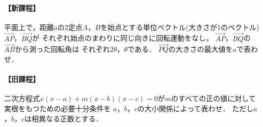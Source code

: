 \documentclass[../../main.tex]{subfiles}
\begin{document}
\paragraph{【新課程】}
平面上で，距離$a$の2定点$A$，$B$を始点とする単位ベクトル(大きさが1のベクトル)
$\overrightarrow{AP}$，$\overrightarrow{BQ}$が
それぞれ始点のまわりに同じ向きに回転運動をなし，
$\overrightarrow{AP}$，$\overrightarrow{BQ}$の$\overrightarrow{AB}$から測った回転角は
それぞれ$2\theta$，$\theta$である．
$\overrightarrow{PQ}$の大きさの最大値を$a$で表わせ．

\paragraph{【旧課程】}
二次方程式$x(x-a)+m(x-b)(x-c)=0$が$m$のすべての正の値に対して実根をもつための必要十分条件を
$a$，$b$，$c$の大小関係によって表わせ．
ただし$a$，$b$，$c$は相異なる正数とする．
\end{document}
